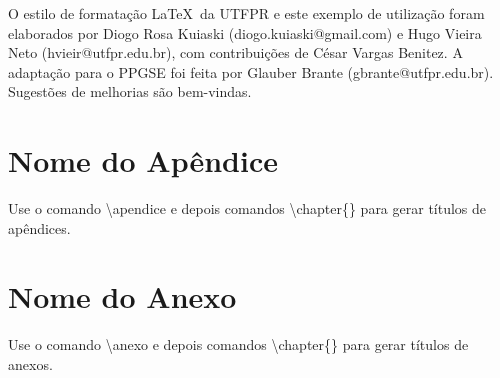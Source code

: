 \documentclass[openright]{normas-utf-tex} %
\begin{document}
O estilo de formatação \LaTeX\ da UTFPR e este exemplo de utilização foram elaborados por Diogo Rosa Kuiaski (diogo.kuiaski@gmail.com) e Hugo Vieira Neto (hvieir@utfpr.edu.br), com contribuições de César Vargas Benitez. A adaptação para o PPGSE foi feita por Glauber Brante (gbrante@utfpr.edu.br). Sugestões de melhorias são bem-vindas.



\clearpage %
\label{bibstart}
\label{bibend}


\apendice
\chapter{Nome do Apêndice}
\label{chap:apendice}

Use o comando {\ttfamily \textbackslash apendice} e depois comandos {\ttfamily \textbackslash chapter\{\}}
para gerar títulos de apêndices.


\anexo
\chapter{Nome do Anexo}
\label{chap:anexo}

Use o comando {\ttfamily \textbackslash anexo} e depois comandos {\ttfamily \textbackslash chapter\{\}}
para gerar títulos de anexos.


%
%
%
%
\end{document}
